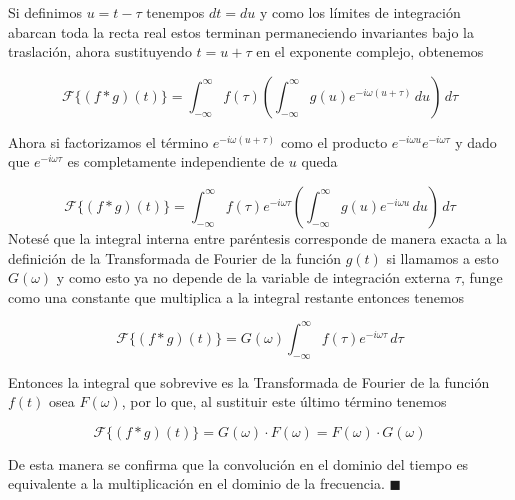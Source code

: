 Si definimos $u = t - \tau$ tenempos $dt = du$ y como los límites de integración abarcan toda la recta real estos terminan permaneciendo invariantes bajo la traslación, ahora sustituyendo $t = u + \tau$ en el exponente complejo, obtenemos

\begin{equation}
    \mathcal{F}\{(f * g)(t)\} = \int_{-\infty}^{\infty} f(\tau) \left( \int_{-\infty}^{\infty} g(u) e^{-i\omega (u + \tau)} \, du \right) \, d\tau
\end{equation}

Ahora si factorizamos el término $e^{-i\omega (u + \tau)}$ como el producto $e^{-i\omega u} e^{-i\omega \tau}$ y dado que $e^{-i\omega \tau}$ es completamente independiente de $u$ queda

\begin{equation}
    \mathcal{F}\{(f * g)(t)\} = \int_{-\infty}^{\infty} f(\tau) e^{-i\omega \tau} \left( \int_{-\infty}^{\infty} g(u) e^{-i\omega u} \, du \right) \, d\tau
\end{equation}
Notesé que la integral interna entre paréntesis corresponde de manera exacta a la definición de la Transformada de Fourier de la función $g(t)$ si llamamos a esto $G(\omega)$ y como esto ya no depende de la variable de integración externa $\tau$, funge como una constante que multiplica a la integral restante entonces tenemos

\begin{equation}
    \mathcal{F}\{(f * g)(t)\} = G(\omega) \int_{-\infty}^{\infty} f(\tau) e^{-i\omega \tau} \, d\tau
\end{equation}

Entonces la integral que sobrevive es la Transformada de Fourier de la función $f(t)$ osea $F(\omega)$, por lo que, al sustituir este último término tenemos

\begin{equation}
    \mathcal{F}\{(f * g)(t)\} = G(\omega) \cdot F(\omega) = F(\omega) \cdot G(\omega)
\end{equation}

De esta manera se confirma que la convolución en el dominio del tiempo es equivalente a la multiplicación en el dominio de la frecuencia. \hfill $\blacksquare$
